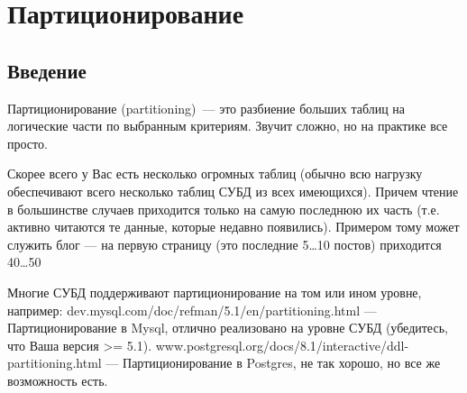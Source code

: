 \chapter{Партиционирование}
\section{Введение}
Партиционирование (partitioning)~--- это разбиение больших таблиц на логические части по выбранным критериям. Звучит сложно, но на практике все просто.

Скорее всего у Вас есть несколько огромных таблиц (обычно всю нагрузку обеспечивают всего несколько таблиц СУБД из всех имеющихся). Причем чтение в большинстве случаев приходится только на самую последнюю их часть (т.е. активно читаются те данные, которые недавно появились). Примером тому может служить блог — на первую страницу (это последние 5…10 постов) приходится 40…50%

Многие СУБД поддерживают партиционирование на том или ином уровне, например:
dev.mysql.com/doc/refman/5.1/en/partitioning.html — Партиционирование в Mysql, отлично реализовано на уровне СУБД (убедитесь, что Ваша версия >= 5.1).
www.postgresql.org/docs/8.1/interactive/ddl-partitioning.html — Партиционирование в Postgres, не так хорошо, но все же возможность есть.